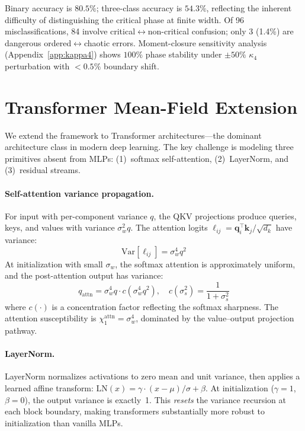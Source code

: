 \documentclass[10pt]{article}
\newcommand{\Var}{\mathrm{Var}}
\begin{document}
Binary accuracy is $80.5\%$; three-class accuracy is $54.3\%$, reflecting the inherent difficulty of distinguishing the critical phase at finite width.
Of 96 misclassifications, 84 involve critical$\leftrightarrow$non-critical confusion; only 3 (1.4\%) are dangerous ordered$\leftrightarrow$chaotic errors.
Moment-closure sensitivity analysis (Appendix~\ref{app:kappa4}) shows $100\%$ phase stability under $\pm 50\%$ $\kappa_4$ perturbation with $<0.5\%$ boundary shift.

\section{Transformer Mean-Field Extension}
\label{sec:transformer}

We extend the framework to Transformer architectures---the dominant architecture class in modern deep learning.
The key challenge is modeling three primitives absent from MLPs: (1)~softmax self-attention, (2)~LayerNorm, and (3)~residual streams.

\paragraph{Self-attention variance propagation.}
For input with per-component variance $q$, the QKV projections produce queries, keys, and values with variance $\sigma_w^2 q$.
The attention logits $\ell_{ij} = \mathbf{q}_i^\top \mathbf{k}_j / \sqrt{d_k}$ have variance:
\begin{equation}
    \Var[\ell_{ij}] = \sigma_w^4 q^2
    \label{eq:attn-logit-var}
\end{equation}
At initialization with small $\sigma_w$, the softmax attention is approximately uniform, and the post-attention output has variance:
\begin{equation}
    q_{\text{attn}} = \sigma_w^4 q \cdot c(\sigma_w^4 q^2), \quad c(\sigma_s^2) = \frac{1}{1 + \sigma_s^2}
    \label{eq:attn-output-var}
\end{equation}
where $c(\cdot)$ is a concentration factor reflecting the softmax sharpness.
The attention susceptibility is $\chi_1^{\text{attn}} = \sigma_w^4$, dominated by the value--output projection pathway.

\paragraph{LayerNorm.}
LayerNorm normalizes activations to zero mean and unit variance, then applies a learned affine transform:
$\text{LN}(x) = \gamma \cdot (x - \mu) / \sigma + \beta$.
At initialization ($\gamma = 1$, $\beta = 0$), the output variance is exactly~1.
This \emph{resets} the variance recursion at each block boundary, making transformers substantially more robust to initialization than vanilla MLPs.
\end{document}

